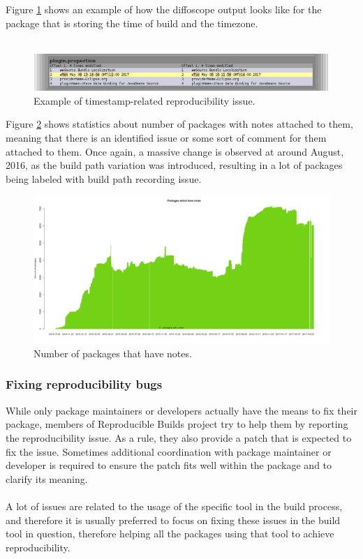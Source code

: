 {Figure \ref{fig:timestamps} shows an example of how the diffoscope output looks like for the package that is storing the time of build and the timezone.\\\\
\FloatBarrier

\begin{figure}[h]
\centering
\includegraphics[width=1\textwidth]{fig/timestamp.png}
\caption{\label{fig:timestamps}Example of timestamp-related reproducibility issue.}
\end{figure}

Figure \ref{fig:stats_notes} shows statistics about number of packages with notes attached to them, meaning that there is an identified issue or some sort of comment for them attached to them. Once again, a massive change is observed at around August, 2016, as the build path variation was introduced, resulting in a lot of packages being labeled with build path recording issue.\\
\FloatBarrier

\begin{figure}[h]
\centering
\includegraphics[width=1.05\textwidth]{fig/stats_notes.png}
\caption{\label{fig:stats_notes}Number of packages that have notes. \autocite{tests-rbo}}
\end{figure}
\subsubsection[Fixing reproducibility bugs]{Fixing reproducibility bugs}
While only package maintainers or developers actually have the means to fix their package, members of Reproducible Builds project try to help them by reporting the reproducibility issue. As a rule, they also provide a patch that is expected to fix the issue. Sometimes additional coordination with package maintainer or developer is required to ensure the patch fits well within the package and to clarify its meaning.\\\\
A lot of issues are related to the usage of the specific tool in the build process, and therefore it is usually preferred to focus on fixing these issues in the build tool in question, therefore helping all the packages using that tool to achieve reproducibility.

}
